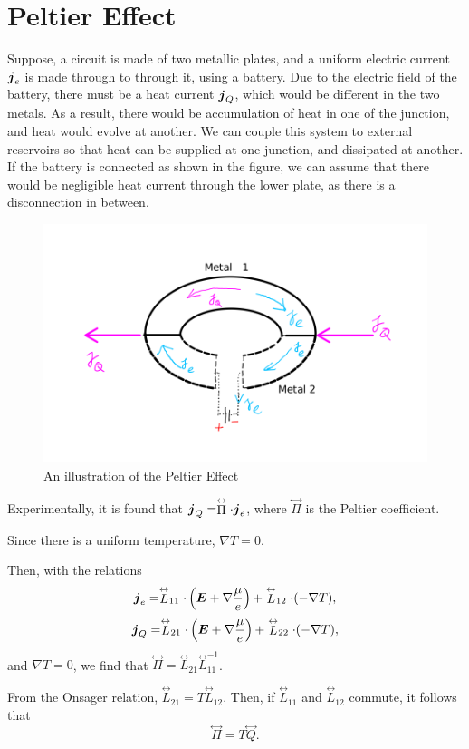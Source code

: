 \documentclass{report}
\renewcommand\vec[1]{\ensuremath\boldsymbol{#1}} %
\begin{document}
\section{Peltier Effect}
Suppose, a circuit is made of two metallic plates, and a uniform electric current $\vec{j}_e$ is made through to through it, using a battery. Due to the electric field of the battery, there must be a heat current $\vec{j}_Q$, which would be different in the two metals. As a result, there would be accumulation of heat in one of the junction, and heat would evolve at another. We can couple this system to external reservoirs so that heat can be supplied at one junction, and dissipated at another. If the battery is connected as shown in the figure, we can assume that there would be negligible heat current through the lower plate, as there is a disconnection in between.
\begin{figure}[h!]
	\centering
	\includegraphics[width=0.7\linewidth]{peltier}
	\caption{An illustration of the Peltier Effect}
	\label{fig:peltier}
\end{figure}

Experimentally, it is found that $\vec{j}_Q = \stackrel{\leftrightarrow}{\Pi} \cdot \vec{j}_e$, where $\stackrel{\leftrightarrow}{\Pi}$ is the Peltier coefficient.

Since there is a uniform temperature, $\nabla T = 0$.

Then, with the relations $$\vec{j}_e = \stackrel{\leftrightarrow}{L}_{11} \cdot \left(\vec{E} + \nabla \frac{\mu}{e}\right) + \stackrel{\leftrightarrow}{L}_{12} \cdot (-\nabla{T}),$$  
$$\vec{j}_Q = \stackrel{\leftrightarrow}{L}_{21} \cdot \left(\vec{E} + \nabla \frac{\mu}{e}\right)  + \stackrel{\leftrightarrow}{L}_{22} \cdot (-\nabla{T}),$$ and $\nabla T = 0$, we find that $\stackrel{\leftrightarrow}{\Pi} =  \stackrel{\leftrightarrow}{L}_{21} {\stackrel{\leftrightarrow}{L}}^{-1}_{11}$.

From the Onsager relation, $\stackrel{\leftrightarrow}{L}_{21} = T \stackrel{\leftrightarrow}{L}_{12}$. Then, if $\stackrel{\leftrightarrow}{L}_{11}$ and $\stackrel{\leftrightarrow}{L}_{12}$ commute, it follows that $$\boxed{\stackrel{\leftrightarrow}{\Pi} =  T \stackrel{\leftrightarrow}{Q}}.$$
\end{document}

